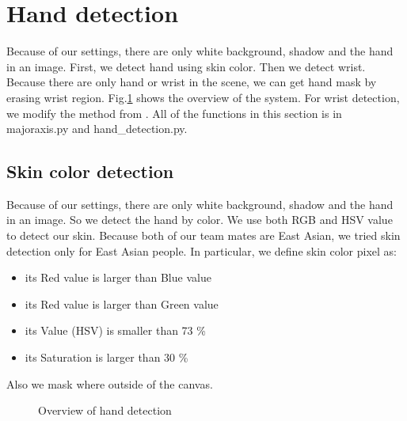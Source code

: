 \section{Hand detection}
Because of our settings, there are only white background, shadow and the hand in an image.
First, we detect hand using skin color. Then we detect wrist. Because there are only hand or wrist in the scene, we can get hand mask by erasing wrist region. Fig.\ref{fig:hand} shows the overview of the system. For wrist detection, we modify the method from \cite{ra11}.
All of the functions in this section is in majoraxis.py and hand\_detection.py.

\subsection{Skin color detection}
Because of our settings, there are only white background, shadow and the hand in an image.
So we detect the hand by color. We use both RGB and HSV value to detect our skin.
Because both of our team mates are East Asian, we tried skin detection only for East Asian people.
In particular, we define skin color pixel as:
\begin{itemize}
  \item its Red value is larger than Blue value
  \item its Red value is larger than Green value
  \item its Value (HSV) is smaller than 73 \%
  \item its Saturation is larger than 30 \%
 \end{itemize}
Also we mask where outside of the canvas.
\begin{landscape}
\begin{figure}[htbp]
 \centering
 
 \caption{Overview of hand detection}
 \label{fig:hand}
\end{figure}
\end{landscape}



